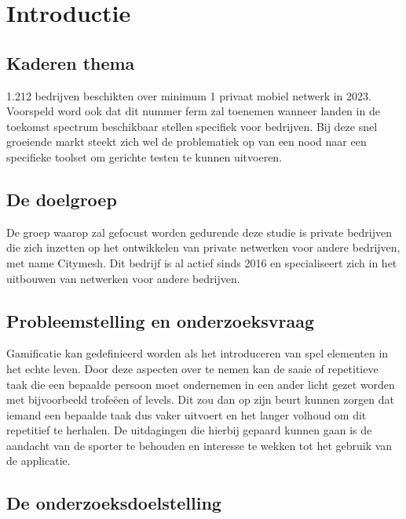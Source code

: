 
\section{Introductie}%
\label{sec:introductie}

\subsection{Kaderen thema}

1.212 bedrijven beschikten over minimum 1 privaat mobiel netwerk in 2023. Voorspeld word ook dat dit nummer ferm zal toenemen wanneer landen in de toekomst spectrum beschikbaar stellen specifiek voor bedrijven. \autocite{Dux2023} Bij deze snel groeiende markt steekt zich wel de problematiek op van een nood naar een specifieke toolset om gerichte testen te kunnen uitvoeren.

\subsection{De doelgroep}

De groep waarop zal gefocust worden gedurende deze studie is private bedrijven die zich inzetten op het ontwikkelen van private netwerken voor andere bedrijven, met name Citymesh. Dit bedrijf is al actief sinds 2016 en specialiseert zich in het uitbouwen van netwerken voor andere bedrijven. \autocite{Cassauwers2019}

\subsection{Probleemstelling en onderzoeksvraag}

Gamificatie kan gedefinieerd worden als het introduceren van spel elementen in het echte leven. \autocite{Deterding2011} Door deze aspecten over te nemen kan de saaie of repetitieve taak die een bepaalde persoon moet ondernemen in een ander licht gezet worden met bijvoorbeeld trofeëen of levels. Dit zou dan op zijn beurt kunnen zorgen dat iemand een bepaalde taak dus vaker uitvoert en het langer volhoud om dit repetitief te herhalen. De uitdagingen die hierbij gepaard kunnen gaan is de aandacht van de sporter te behouden en interesse te wekken tot het gebruik van de applicatie. 

\subsection{De onderzoeksdoelstelling}

